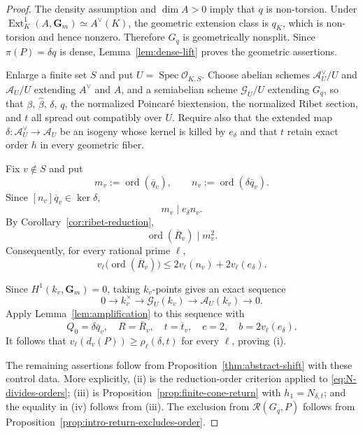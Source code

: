 \documentclass[11pt,letterpaper,reqno]{amsart}
\theoremstyle{definition}
\theoremstyle{remark}
\newcommand{\Gm}{\mathbf G_m}
\newcommand{\ord}{\operatorname{ord}}
\newcommand{\Ext}{\operatorname{Ext}}
\newcommand{\Spec}{\operatorname{Spec}}
\newcommand{\cO}{\mathcal O}
\begin{document}
\begin{proof}
The density assumption and $\dim A>0$ imply that $q$ is non-torsion.  Under
$\Ext_K^1(A,\Gm)\simeq A^\vee(K)$, the geometric extension class is
$q_{\overline K}$, which is non-torsion and hence nonzero.  Therefore $G_q$ is
geometrically nonsplit.  Since $\pi(P)=\delta q$ is dense,
Lemma~\ref{lem:dense-lift} proves the geometric assertions.

Enlarge a finite set $S$ and put $U=\Spec\cO_{K,S}$.  Choose abelian schemes
$\mathcal A_U^\vee/U$ and $\mathcal A_U/U$ extending $A^\vee$ and $A$, and a
semiabelian scheme $\mathcal G_U/U$ extending $G_q$, so that $\beta$,
$\widehat\beta$, $\delta$, $q$, the normalized Poincar\'e biextension, the
normalized Ribet section, and $t$ all spread out compatibly over $U$.  Require
also that the extended map
$\delta:\mathcal A_U^\vee\to\mathcal A_U$ be an isogeny whose kernel is killed
by $e_\delta$ and that $t$ retain exact order $h$ in every geometric fiber.

Fix $v\notin S$ and put
\[
 m_v:=\ord(\overline q_v),
 \qquad
 n_v:=\ord(\delta\overline q_v).
\]
Since $[n_v]\overline q_v\in\ker\delta$,
\begin{equation}\label{eq:m-divides-en}
 m_v\mid e_\delta n_v.
\end{equation}
By Corollary~\ref{cor:ribet-reduction},
\begin{equation}\label{eq:R-order-m2}
 \ord(\overline R_v)\mid m_v^2.
\end{equation}
Consequently, for every rational prime $\ell$,
\begin{equation}\label{eq:R-vell-bound}
 v_\ell\bigl(\ord(\overline R_v)\bigr)
 \le2v_\ell(n_v)+2v_\ell(e_\delta).
\end{equation}

Since $H^1(k_v,\Gm)=0$, taking $k_v$-points gives an exact sequence
\[
 0\longrightarrow k_v^\times
 \longrightarrow\mathcal G_U(k_v)
 \longrightarrow\mathcal A_U(k_v)
 \longrightarrow0.
\]
Apply Lemma~\ref{lem:amplification} to this sequence
with
\[
 Q_0=\delta\overline q_v,
 \quad R=\overline R_v,
 \quad t=\overline t_v,
 \quad c=2,
 \quad b=2v_\ell(e_\delta).
\]
It follows that $v_\ell(d_v(P))\ge\rho_\ell(\delta,t)$ for every $\ell$,
proving (i).

The remaining assertions follow from Proposition~\ref{thm:abstract-shift} with these
control data.  More explicitly, (ii) is the reduction-order criterion applied
to \eqref{eq:N-divides-orders}; (iii) is
Proposition~\ref{prop:finite-cone-return} with $h_1=N_{\delta,t}$; and the equality in
(iv) follows from (iii).  The exclusion from $\mathscr R(G_q,P)$ follows from
Proposition~\ref{prop:intro-return-excludes-order}.
\end{proof}
\end{document}
